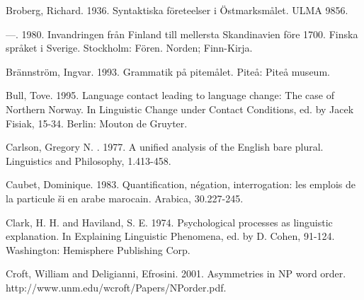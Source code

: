 \begin{styleBodytextC}
Broberg, Richard. 1936. Syntaktiska företeelser i Östmarksmålet. ULMA 9856.

\end{styleBodytextC}

\begin{styleBodytextC}
—. 1980. Invandringen från Finland till mellersta Skandinavien före 1700. Finska språket i Sverige. Stockholm: Fören. Norden; Finn-Kirja.

\end{styleBodytextC}

\begin{styleBodytextC}
Brännström, Ingvar. 1993. Grammatik på pitemålet. Piteå: Piteå museum.

\end{styleBodytextC}

\begin{styleBodytextC}
Bull, Tove. 1995. Language contact leading to language change: The case of Northern Norway. In Linguistic Change under Contact Conditions, ed. by Jacek Fisiak, 15-34. Berlin: Mouton de Gruyter.

\end{styleBodytextC}

\begin{styleBodytextC}
Carlson, Gregory N. . 1977. A unified analysis of the English bare plural. Linguistics and Philosophy, 1.413-458.

\end{styleBodytextC}

\begin{styleBodytextC}
Caubet, Dominique. 1983. Quantification, négation, interrogation: les emplois de la particule {\textquotedbl}ši{\textquotedbl} en arabe marocain. Arabica, 30.227-245.

\end{styleBodytextC}

\begin{styleBodytextC}
Clark, H. H. and Haviland, S. E. 1974. Psychological processes as linguistic explanation. In Explaining Linguistic Phenomena, ed. by D. Cohen, 91-124. Washington: Hemisphere Publishing Corp.

\end{styleBodytextC}

\begin{styleBodytextC}
Croft, William and Deligianni, Efrosini. 2001. Asymmetries in NP word order. http://www.unm.edu/{\Tilde}wcroft/Papers/NPorder.pdf. 

\end{styleBodytextC}


